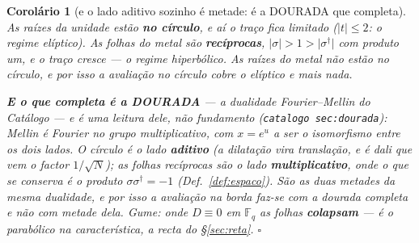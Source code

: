 \documentclass[11pt,a4paper]{article}
\newtheorem{corolario}[teorema]{Corolário}
\newcommand{\code}[1]{\texttt{\small #1}}
\newcommand{\leitura}[1]{\code{#1}}
\newcommand{\abs}[1]{\lvert #1\rvert}
\newcommand{\dg}{^{\dagger}}
\begin{document}
\begin{corolario}[e o lado aditivo sozinho é metade: é a DOURADA que
completa]\label{cor:dourada-completa}
As raízes da unidade estão \textbf{no círculo}, e aí o traço fica \emph{limitado}
($\abs{t}\leq2$: o regime elíptico). As folhas do metal são \textbf{recíprocas},
$\abs{\sigma}>1>\abs{\sigma\dg}$ com produto um, e o traço \emph{cresce} --- o
regime hiperbólico. \emph{As raízes do metal não estão no círculo}, e por isso a
avaliação no círculo cobre o elíptico e mais nada.

\textbf{E o que completa é a DOURADA} --- a dualidade Fourier--Mellin do
\emph{Catálogo} --- e é uma \emph{leitura} dele, não fundamento
(\leitura{catalogo sec:dourada}): \emph{Mellin é Fourier no grupo multiplicativo}, com
$x=e^{u}$ a ser o isomorfismo entre os dois lados. O círculo é o lado \textbf{aditivo}
(a dilatação vira translação, e é dali que vem o factor $1/\sqrt N$); as folhas recíprocas
são o lado \textbf{multiplicativo}, onde o que se conserva é o \emph{produto}
$\sigma\sigma\dg=-1$ (Def.~\ref{def:espaco}). \emph{São as duas metades da mesma
dualidade}, e por isso a avaliação na borda faz-se com a dourada completa e não com metade
dela. \emph{Gume}: onde $D\equiv0$
em $\mathbb{F}_q$ as folhas \textbf{colapsam} --- é o parabólico na
característica, a recta do \S\ref{sec:reta}. $\square$
\end{corolario}
\end{document}
